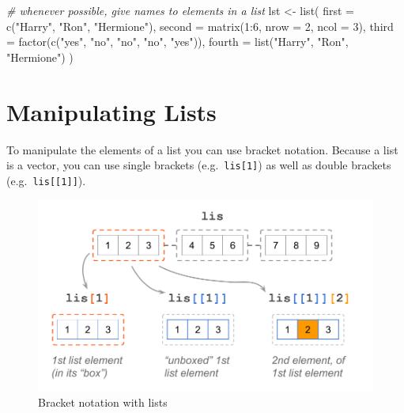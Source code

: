 \documentclass[
]{book}
\newenvironment{Shaded}{\begin{snugshade}}{\end{snugshade}}
\newcommand{\AttributeTok}[1]{\textcolor[rgb]{0.77,0.63,0.00}{#1}}
\newcommand{\CommentTok}[1]{\textcolor[rgb]{0.56,0.35,0.01}{\textit{#1}}}
\newcommand{\DecValTok}[1]{\textcolor[rgb]{0.00,0.00,0.81}{#1}}
\newcommand{\FunctionTok}[1]{\textcolor[rgb]{0.00,0.00,0.00}{#1}}
\newcommand{\NormalTok}[1]{#1}
\newcommand{\OtherTok}[1]{\textcolor[rgb]{0.56,0.35,0.01}{#1}}
\newcommand{\SpecialCharTok}[1]{\textcolor[rgb]{0.00,0.00,0.00}{#1}}
\newcommand{\StringTok}[1]{\textcolor[rgb]{0.31,0.60,0.02}{#1}}
\begin{document}
\begin{Shaded}
\begin{Highlighting}[]
\CommentTok{\# whenever possible, give names to elements in a list}
\NormalTok{lst }\OtherTok{\textless{}{-}} \FunctionTok{list}\NormalTok{(}
  \AttributeTok{first =} \FunctionTok{c}\NormalTok{(}\StringTok{"Harry"}\NormalTok{, }\StringTok{"Ron"}\NormalTok{, }\StringTok{"Hermione"}\NormalTok{),}
  \AttributeTok{second =} \FunctionTok{matrix}\NormalTok{(}\DecValTok{1}\SpecialCharTok{:}\DecValTok{6}\NormalTok{, }\AttributeTok{nrow =} \DecValTok{2}\NormalTok{, }\AttributeTok{ncol =} \DecValTok{3}\NormalTok{),}
  \AttributeTok{third =} \FunctionTok{factor}\NormalTok{(}\FunctionTok{c}\NormalTok{(}\StringTok{"yes"}\NormalTok{, }\StringTok{"no"}\NormalTok{, }\StringTok{"no"}\NormalTok{, }\StringTok{"no"}\NormalTok{, }\StringTok{"yes"}\NormalTok{)),}
  \AttributeTok{fourth =} \FunctionTok{list}\NormalTok{(}\StringTok{"Harry"}\NormalTok{, }\StringTok{"Ron"}\NormalTok{, }\StringTok{"Hermione"}\NormalTok{)}
\NormalTok{)}
\end{Highlighting}
\end{Shaded}

\hypertarget{manipulating-lists}{%
\section{Manipulating Lists}\label{manipulating-lists}}

To manipulate the elements of a list you can use bracket notation. Because a
list is a vector, you can use single brackets (e.g.~\texttt{lis{[}1{]}}) as well as
double brackets (e.g.~\texttt{lis{[}{[}1{]}{]}}).

\begin{figure}

{\centering \includegraphics[width=0.75\linewidth]{images/objects/obj-list-brackets1} 

}

\caption{Bracket notation with lists}\label{fig:unnamed-chunk-124}
\end{figure}
\end{document}
